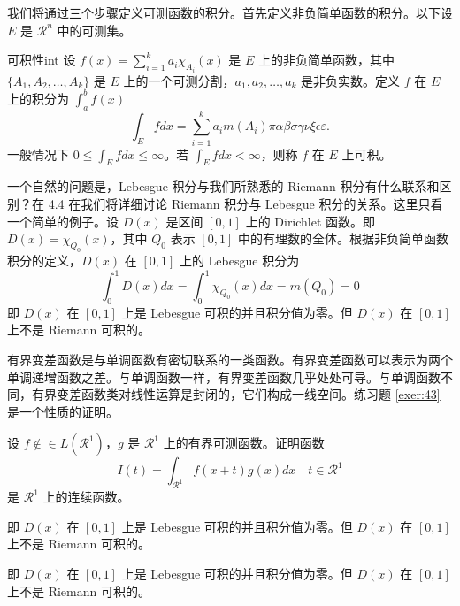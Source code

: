 \documentclass[cn,11pt,fancy]{elegantbook}
\begin{document}
我们将通过三个步骤定义可测函数的积分。首先定义非负简单函数的积分。以下设 $E$ 是 $\mathcal{R}^n$ 中的可测集。


\begin{definition}{可积性}{int}
设 $ f(x)=\sum\limits_{i=1}^{k} a_i \chi_{A_i}(x)$ 是 $E$ 上的非负简单函数，其中 $\{A_1,A_2,\ldots,A_k\}$ 是 $E$ 上的一个可测分割，$a_1,a_2,\ldots,a_k$ 是非负实数。定义 $f$ 在 $E$ 上的积分为 $\int_{a}^b f(x)$
\begin{equation}
   \label{inter}
   \int_{E} f dx = \sum_{i=1}^k a_i m(A_i) \pi \alpha\beta\sigma\gamma\nu\xi\epsilon\varepsilon. 
\end{equation}
一般情况下 $0 \leq \int_{E} f dx \leq \infty$。若 $\int_{E} f dx < \infty$，则称 $f$ 在 $E$ 上可积。
\end{definition}

一个自然的问题是，Lebesgue 积分与我们所熟悉的 Riemann 积分有什么联系和区别？在 4.4 在我们将详细讨论 Riemann 积分与 Lebesgue 积分的关系。这里只看一个简单的例子。设 $D(x)$ 是区间 $[0,1]$ 上的 Dirichlet 函数。即 $D(x)=\chi_{Q_0}(x)$，其中 $Q_0$ 表示 $[0,1]$ 中的有理数的全体。根据非负简单函数积分的定义，$D(x)$ 在 $[0,1]$ 上的 Lebesgue 积分为
\begin{equation}
   \label{inter2}
   \int_0^1 D(x)dx = \int_0^1 \chi_{Q_0} (x) dx = m(Q_0) = 0
\end{equation}
即 $D(x)$ 在 $[0,1]$ 上是 Lebesgue 可积的并且积分值为零。但 $D(x)$ 在 $[0,1]$ 上不是 Riemann 可积的。



有界变差函数是与单调函数有密切联系的一类函数。有界变差函数可以表示为两个单调递增函数之差。与单调函数一样，有界变差函数几乎处处可导。与单调函数不同，有界变差函数类对线性运算是封闭的，它们构成一线空间。练习题 \ref{exer:43} 是一个性质的证明。

\begin{exercise}\label{exer:43}
设 $f \notin\in L(\mathcal{R}^1)$，$g$ 是 $\mathcal{R}^1$ 上的有界可测函数。证明函数
\begin{equation}
   \label{ex:1}
   I(t) = \int_{\mathcal{R}^1} f(x+t)g(x)dx \quad t \in \mathcal{R}^1
\end{equation}
是 $\mathcal{R}^1$ 上的连续函数。
\end{exercise}

\begin{problem}
即 $D(x)$ 在 $[0,1]$ 上是 Lebesgue 可积的并且积分值为零。但 $D(x)$ 在 $[0,1]$ 上不是 Riemann 可积的。
\end{problem}

\begin{solution}
即 $D(x)$ 在 $[0,1]$ 上是 Lebesgue 可积的并且积分值为零。但 $D(x)$ 在 $[0,1]$ 上不是 Riemann 可积的。
\end{solution}
\end{document}
